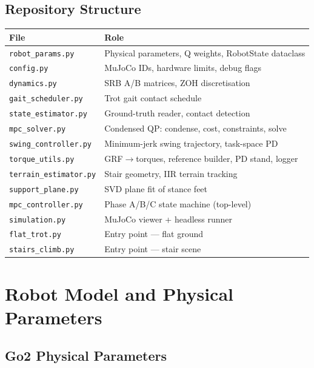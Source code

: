 \documentclass[12pt,a4paper]{report}
\begin{document}
\section{Repository Structure}

\begin{center}
\begin{tabular}{ll}
\toprule
\textbf{File} & \textbf{Role} \\
\midrule
\texttt{robot\_params.py}     & Physical parameters, Q weights, RobotState dataclass \\
\texttt{config.py}            & MuJoCo IDs, hardware limits, debug flags \\
\texttt{dynamics.py}          & SRB A/B matrices, ZOH discretisation \\
\texttt{gait\_scheduler.py}   & Trot gait contact schedule \\
\texttt{state\_estimator.py}  & Ground-truth reader, contact detection \\
\texttt{mpc\_solver.py}       & Condensed QP: condense, cost, constraints, solve \\
\texttt{swing\_controller.py} & Minimum-jerk swing trajectory, task-space PD \\
\texttt{torque\_utils.py}     & GRF$\to$torques, reference builder, PD stand, logger \\
\texttt{terrain\_estimator.py}& Stair geometry, IIR terrain tracking \\
\texttt{support\_plane.py}    & SVD plane fit of stance feet \\
\texttt{mpc\_controller.py}   & Phase A/B/C state machine (top-level) \\
\texttt{simulation.py}        & MuJoCo viewer + headless runner \\
\texttt{flat\_trot.py}        & Entry point — flat ground \\
\texttt{stairs\_climb.py}     & Entry point — stair scene \\
\bottomrule
\end{tabular}
\end{center}

\chapter{Robot Model and Physical Parameters}

\section{Go2 Physical Parameters}
\end{document}
